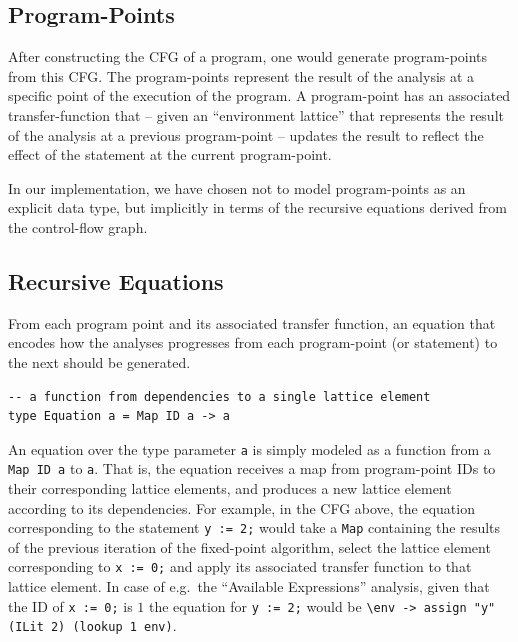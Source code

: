 \documentclass{article}
\begin{document}
\subsection{Program-Points}\label{program-points}

After constructing the CFG of a program, one would generate
program-points from this CFG. The program-points represent the result of
the analysis at a specific point of the execution of the program. A
program-point has an associated transfer-function that -- given an
``environment lattice'' that represents the result of the analysis at a
previous program-point -- updates the result to reflect the effect of the
statement at the current program-point.

In our implementation, we have chosen not to model program-points as an
explicit data type, but implicitly in terms of the recursive equations
derived from the control-flow graph.

\subsection{Recursive Equations}\label{recursive-equations}

From each program point and its associated transfer function, an
equation that encodes how the analyses progresses from each
program-point (or statement) to the next should be generated.

\begin{verbatim}
-- a function from dependencies to a single lattice element
type Equation a = Map ID a -> a
\end{verbatim}

An equation over the type parameter \texttt{a} is simply modeled as a
function from a \texttt{Map ID a} to \texttt{a}. That is, the equation
receives a map from program-point IDs to their corresponding lattice
elements, and produces a new lattice element according to its
dependencies. For example, in the CFG above, the equation corresponding
to the statement \texttt{y := 2;} would take a \texttt{Map} containing
the results of the previous iteration of the fixed-point algorithm,
select the lattice element corresponding to \texttt{x := 0;} and apply
its associated transfer function to that lattice element. In case of
e.g.~the ``Available Expressions'' analysis, given that the ID of
\texttt{x := 0;} is $1$ the equation for \texttt{y := 2;} would be
\texttt{\textbackslash{}env -\textgreater{} assign "y" (ILit 2) (lookup 1 env)}.
\end{document}

